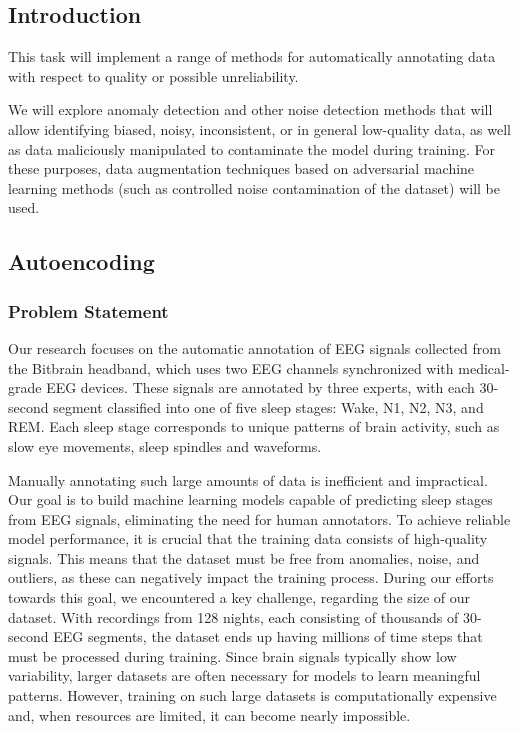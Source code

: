 
\subsection{Introduction}

This task will implement a range of methods for automatically
annotating data with respect to quality or possible unreliability.

We will explore anomaly detection and other noise detection methods
that will allow identifying biased, noisy, inconsistent, or in general
low-quality data, as well as data maliciously manipulated to
contaminate the model during training. For these purposes, data
augmentation techniques based on adversarial machine learning methods
(such as controlled noise contamination of the dataset) will be used.

\subsection{Autoencoding}

\subsubsection{Problem Statement}

Our research focuses on the automatic annotation of EEG signals collected from the Bitbrain headband, which uses two EEG channels synchronized with medical-grade EEG devices. These signals are annotated by three experts, with each 30-second segment classified into one of five sleep stages: Wake, N1, N2, N3, and REM. Each sleep stage corresponds to unique patterns of brain activity, such as slow eye movements, sleep spindles and waveforms.

Manually annotating such large amounts of data is inefficient and impractical. Our goal is to build machine learning models capable of predicting sleep stages from EEG signals, eliminating the need for human annotators. To achieve reliable model performance, it is crucial that the training data consists of high-quality signals. This means that the dataset must be free from anomalies, noise, and outliers, as these can negatively impact the training process. During our efforts towards this goal, we encountered a key challenge, regarding the size of our dataset. With recordings from 128 nights, each consisting of thousands of 30-second EEG segments, the dataset ends up having millions of time steps that must be processed during training. Since brain signals typically show low variability, larger datasets are often necessary for models to learn meaningful patterns. However, training on such large datasets is computationally expensive and, when resources are limited, it can become nearly impossible.

